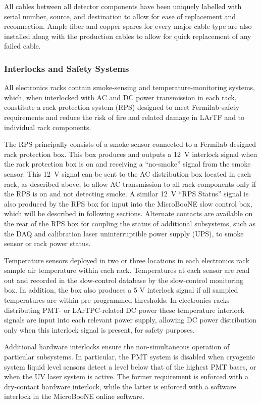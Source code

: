All cables between all detector components have been uniquely labelled with serial number, source, and destination to allow for ease of replacement and reconnection.  Ample fiber and copper spares for every major cable type are also installed along with the production cables to allow for quick replacement of any failed cable.

\subsubsection{Interlocks and Safety Systems}
All electronics racks contain smoke-sensing and temperature-monitoring systems, which, when interlocked with AC and DC power transmission in each rack, constitute a rack protection system (RPS) designed to meet Fermilab safety requirements and reduce the risk of fire and related damage in LArTF and to individual rack components.

The RPS principally consists of a smoke sensor connected to a Fermilab-designed rack protection box.  This box produces and outputs a 12~V interlock signal when the rack protection box is on and receiving a ``no-smoke'' signal from the smoke sensor.  This 12~V signal can be sent to the AC distribution box located in each rack, as described above, to allow AC transmission to all rack components only if the RPS is on and not detecting smoke.  A similar 12~V ``RPS Status'' signal is also produced by the RPS box for input into the MicroBooNE slow control box, which will be described in following sections.  Alternate contacts are available on the rear of the RPS box for coupling the status of additional subsystems, such as the DAQ and calibration laser uninterruptible power supply (UPS), to smoke sensor or rack power status.

Temperature sensors deployed in two or three locations in each electronics rack sample air temperature within each rack.  Temperatures at each sensor are read out and recorded in the slow-control database by the slow-control monitoring box.  In addition, the box also produces a 5 V interlock signal if all sampled temperatures are within pre-programmed thresholds.  In electronics racks distributing PMT- or LArTPC-related DC power these temperature interlock signals are input into each relevant power supply, allowing DC power distribution only when this interlock signal is present, for safety purposes.

Additional hardware interlocks ensure the non-simultaneous operation of particular subsystems.  In particular, the PMT system is disabled when cryogenic system liquid level sensors detect a level below that of the highest PMT bases, or when the UV laser system is active.  The former requirement is enforced with a dry-contact hardware interlock, while the latter is enforced with a software interlock in the MicroBooNE online software.


